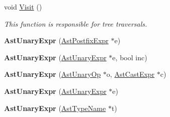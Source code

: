 \begin{DoxyCompactItemize}
\item 
void \hyperlink{classAstUnaryExpr_ae35427088d6f5c889e8e80573a3750fc}{Visit} ()
\begin{DoxyCompactList}\small\item\em This function is responsible for tree traversals. \end{DoxyCompactList}\item 
\hypertarget{classAstUnaryExpr_a7afc6e7c4cf309676aa701656c70453a}{{\bfseries Ast\-Unary\-Expr} (\hyperlink{classAstPostfixExpr}{Ast\-Postfix\-Expr} $\ast$e)}\label{classAstUnaryExpr_a7afc6e7c4cf309676aa701656c70453a}

\item 
\hypertarget{classAstUnaryExpr_a82859566c71d787e29263ff3ba013261}{{\bfseries Ast\-Unary\-Expr} (\hyperlink{classAstUnaryExpr}{Ast\-Unary\-Expr} $\ast$e, bool inc)}\label{classAstUnaryExpr_a82859566c71d787e29263ff3ba013261}

\item 
\hypertarget{classAstUnaryExpr_ad71de2cd2c65b31e5f5f5fde4e75fc14}{{\bfseries Ast\-Unary\-Expr} (\hyperlink{classAstUnaryOp}{Ast\-Unary\-Op} $\ast$o, \hyperlink{classAstCastExpr}{Ast\-Cast\-Expr} $\ast$c)}\label{classAstUnaryExpr_ad71de2cd2c65b31e5f5f5fde4e75fc14}

\item 
\hypertarget{classAstUnaryExpr_a22b7c004d42c54c96b40de10cc90a07e}{{\bfseries Ast\-Unary\-Expr} (\hyperlink{classAstUnaryExpr}{Ast\-Unary\-Expr} $\ast$e)}\label{classAstUnaryExpr_a22b7c004d42c54c96b40de10cc90a07e}

\item 
\hypertarget{classAstUnaryExpr_a305b745cf1449c3d3dc4e74dcd768ef1}{{\bfseries Ast\-Unary\-Expr} (\hyperlink{classAstTypeName}{Ast\-Type\-Name} $\ast$t)}\label{classAstUnaryExpr_a305b745cf1449c3d3dc4e74dcd768ef1}


\end{DoxyCompactItemize}
